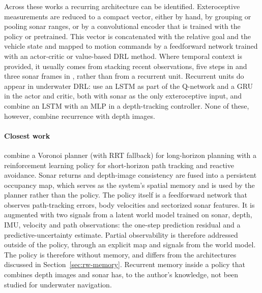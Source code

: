 Across these works a recurring architecture can be identified. Exteroceptive measurements are reduced to a compact vector, either by hand, by grouping or pooling sonar ranges, or by a convolutional encoder that is trained with the policy or pretrained. This vector is concatenated with the relative goal and the vehicle state and mapped to motion commands by a feedforward network trained with an actor-critic or value-based DRL method. Where temporal context is provided, it usually comes from stacking recent observations, five steps in \textcite{yang2022monocular} and three sonar frames in \textcite{shafer2026endtoend}, rather than from a recurrent unit. Recurrent units do appear in underwater DRL: \textcite{yuan2021auv} use an LSTM as part of the Q-network and \textcite{yuan2023auv} a GRU in the actor and critic, both with sonar as the only exteroceptive input, and \textcite{wang2024adversarial} combine an LSTM with an MLP in a depth-tracking controller. None of these, however, combine recurrence with depth images.

\paragraph{Closest work}
\textcite{deowan2026unified} combine a Voronoi planner (with RRT fallback) for long-horizon planning with a reinforcement learning policy for short-horizon path tracking and reactive avoidance. Sonar returns and depth-image consistency are fused into a persistent occupancy map, which serves as the system's spatial memory and is used by the planner rather than the policy. The policy itself is a feedforward network that observes path-tracking errors, body velocities and sectorized sonar features. It is augmented with two signals from a latent world model trained on sonar, depth, IMU, velocity and path observations: the one-step prediction residual and a predictive-uncertainty estimate. Partial observability is therefore addressed outside of the policy, through an explicit map and signals from the world model. The policy is therefore without memory, and differs from the architectures discussed in Section~\ref{sec:rw-memory}. Recurrent memory inside a policy that combines depth images and sonar has, to the author's knowledge, not been studied for underwater navigation.

